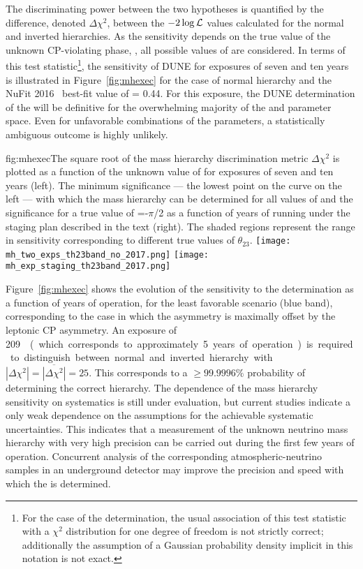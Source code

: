 The discriminating power between the two  hypotheses is quantified
by the difference, denoted $\Delta \chi^2$, between the
$-2\log{\cal L}$ values calculated for the normal and inverted
hierarchies. As the sensitivity depends on the true value of the unknown
CP-violating phase, \deltacp, all possible values of \deltacp are
considered.  In terms of this test statistic\footnote{For the case of the  determination, the usual
  association of this test statistic with a $\chi^2$ distribution for
  one degree of freedom is not strictly correct; additionally the assumption of a
  Gaussian probability density 
  implicit in this notation is not exact.}, the 
sensitivity of DUNE for exposures of seven and ten years is
illustrated in Figure~\ref{fig:mhexec} for the case of normal
hierarchy and the NuFit 2016~\cite{nufit2016} best-fit value of  = 0.44. 
For this exposure, the DUNE determination of the  will be definitive for
the overwhelming majority of the  \deltacp and  parameter space.
Even for unfavorable combinations of the parameters, a statistically
ambiguous outcome is highly unlikely.  
\begin{dunefigure}{fig:mhexec}{The
    square root of the mass hierarchy discrimination metric $\Delta
    \chi^2$ is plotted as a function of the unknown value of \deltacp
    for exposures of seven and ten years  
    (left).  The minimum significance
    --- the lowest point on the curve on the left --- with which the mass
    hierarchy can be determined for all values of \deltacp and the significance for a true value of \deltacp=-$\pi$/2 as a
    function of years of running under the staging plan described in the text (right).
    The shaded regions represent the range in sensitivity corresponding to
    different true values of $\theta_{23}$.}
\texttt{[image: mh\_two\_exps\_th23band\_no\_2017.png]}
\texttt{[image: mh\_exp\_staging\_th23band\_2017.png]}
\end{dunefigure}


Figure~\ref{fig:mhexec} shows the evolution of the sensitivity to the  determination as a function
of years of operation, for the least favorable scenario (blue band), corresponding to the case in which the  asymmetry is
maximally offset by the leptonic CP asymmetry. An exposure of \SI{209}~\ktMWyr{}  
(which corresponds to approximately \num{5} years of operation) is required to distinguish
between normal and inverted hierarchy with $|\Delta \chi^2| =
\overline{|\Delta \chi^2|} = 25$.  This corresponds to a $\geq
99.9996\%$ probability of determining the correct hierarchy. 
The dependence of the mass
hierarchy sensitivity on systematics is still under evaluation, but
current studies indicate a only weak dependence on the assumptions for 
the achievable systematic uncertainties. This indicates that a measurement of the unknown
neutrino mass hierarchy with very high precision can be carried out
during the first few years of operation.
Concurrent analysis of the corresponding atmospheric-neutrino
samples in an underground detector may improve the precision and
speed with which the  is determined.

